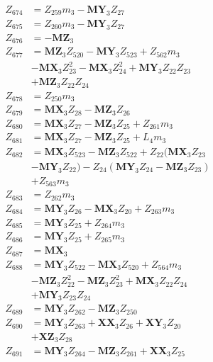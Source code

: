 \begin{multicols}{2}
\begin{align}
Z_{674} &= Z_{259}m_3 - \mathbf{MY}_3Z_{27} \nonumber \\
Z_{675} &= Z_{260}m_3 - \mathbf{MY}_3Z_{27} \nonumber \\
Z_{676} &= -\mathbf{MZ}_3 \nonumber \\
Z_{677} &= \mathbf{MZ}_3Z_{520} - \mathbf{MY}_3Z_{523} + Z_{562}m_3  \nonumber \\
&- \mathbf{MX}_3Z_{23}^2 - \mathbf{MX}_3Z_{24}^2 + \mathbf{MY}_3Z_{22}Z_{23}  \nonumber \\
&+ \mathbf{MZ}_3Z_{22}Z_{24} \nonumber \\
Z_{678} &= Z_{250}m_3 \nonumber \\
Z_{679} &= \mathbf{MX}_3Z_{28} - \mathbf{MZ}_3Z_{26} \nonumber \\
Z_{680} &= \mathbf{MX}_3Z_{27} - \mathbf{MZ}_3Z_{25} + Z_{261}m_3 \nonumber \\
Z_{681} &= \mathbf{MX}_3Z_{27} - \mathbf{MZ}_3Z_{25} + L_4m_3 \nonumber \\
Z_{682} &= \mathbf{MX}_3Z_{523} - \mathbf{MZ}_3Z_{522} + Z_{22}(\mathbf{MX}_3Z_{23}  \nonumber \\
&- \mathbf{MY}_3Z_{22}) - Z_{24}(\mathbf{MY}_3Z_{24} - \mathbf{MZ}_3Z_{23})  \nonumber \\
&+ Z_{563}m_3 \nonumber \\
Z_{683} &= Z_{262}m_3 \nonumber \\
Z_{684} &= \mathbf{MY}_3Z_{26} - \mathbf{MX}_3Z_{20} + Z_{263}m_3 \nonumber \\
Z_{685} &= \mathbf{MY}_3Z_{25} + Z_{264}m_3 \nonumber \\
Z_{686} &= \mathbf{MY}_3Z_{25} + Z_{265}m_3 \nonumber \\
Z_{687} &= \mathbf{MX}_3 \nonumber \\
Z_{688} &= \mathbf{MY}_3Z_{522} - \mathbf{MX}_3Z_{520} + Z_{564}m_3  \nonumber \\
&- \mathbf{MZ}_3Z_{22}^2 - \mathbf{MZ}_3Z_{23}^2 + \mathbf{MX}_3Z_{22}Z_{24}  \nonumber \\
&+ \mathbf{MY}_3Z_{23}Z_{24} \nonumber \\
Z_{689} &= \mathbf{MY}_3Z_{262} - \mathbf{MZ}_3Z_{250} \nonumber \\
Z_{690} &= \mathbf{MY}_3Z_{263} + \mathbf{XX}_3Z_{26} + \mathbf{XY}_3Z_{20}  \nonumber \\
&+ \mathbf{XZ}_3Z_{28} \nonumber \\
Z_{691} &= \mathbf{MY}_3Z_{264} - \mathbf{MZ}_3Z_{261} + \mathbf{XX}_3Z_{25}  \nonumber \\

\end{align}
\end{multicols}
